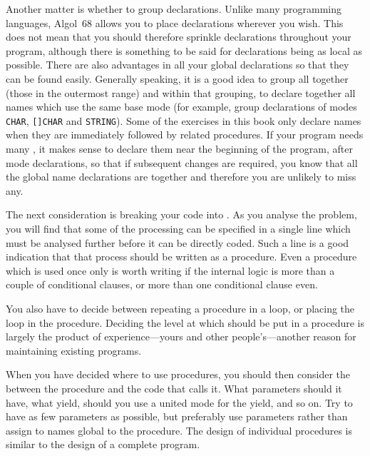 Another matter is whether to group declarations. Unlike many
programming languages, Algol~68 allows you to place declarations
wherever you wish. This does not mean that you should therefore
sprinkle declarations throughout your program, al\-though there is
something to be said for declarations being as local as possible.
There are also advantages in 
all your global declarations so that they can be found easily.
Generally speaking, it is a good idea to group all 
together (those in the outermost range) and within that grouping, to
declare together all names which use the same base mode (for example,
group declarations of modes \verb|CHAR|, \verb|[]CHAR| and
\verb|STRING|).  Some of the exercises in this book only declare
names when they are immediately followed by related procedures. If
your program needs many , it makes
sense to declare them near the beginning of the program, after mode
declarations, so that if subsequent changes are required, you know
that all the global name declarations are together and therefore you
are unlikely to miss any.

The next consideration is breaking your code into
.
As you analyse the problem, you will find that some of the processing
can be specified in a single line which must be analysed further
before it can be directly coded.  Such a line is a good indication
that that process should be written as a procedure.  Even a procedure
which is used once only is worth writing if the internal logic is
more than a couple of conditional clauses, or more than one
conditional clause even.

You also have to decide between repeating a procedure in a loop, or
placing the loop in the procedure.  Deciding the level at which
 should be put in a procedure is largely the
product of experience---yours and other people's---another reason for
maintaining existing programs.

When you have decided where to use procedures, you should then consider
the  between the procedure and the
code that calls it.  What parameters should it have, what yield, should
you use a united mode for the yield, and so on.  Try to have as few
parameters as possible, but preferably use parameters rather than
assign to names global to the procedure.  The design of individual
procedures is similar to the design of a complete program.

